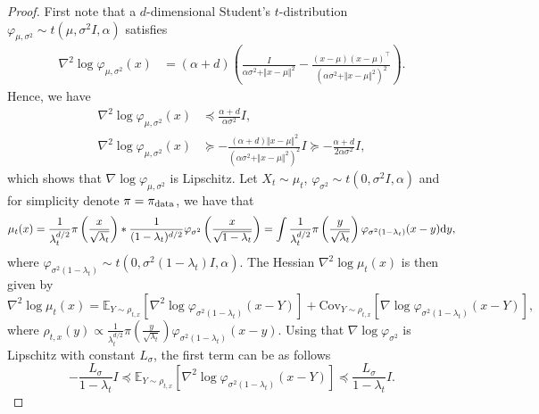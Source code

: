 \begin{proof}
    First note that a $d$-dimensional Student's $t$-distribution $\varphi_{\mu,\sigma^2}\sim t(\mu, \sigma^2 I, \alpha)$ satisfies
    \begin{align*}
         \nabla^2\log \varphi_{\mu, \sigma^2}(x)  &= (\alpha + d) \left( \frac{I}{\alpha \sigma^2 + \Vert x-\mu\Vert^2} - \frac{(x-\mu)(x-\mu)^\intercal}{(\alpha \sigma^2 + \Vert x-\mu\Vert^2)^2}\right).
    \end{align*}
    Hence, we have
    \begin{align*}
    \nabla^2\log \varphi_{\mu, \sigma^2}(x) &\preccurlyeq \frac{\alpha + d}{\alpha \sigma^2} I,\\
         \nabla^2\log \varphi_{\mu, \sigma^2}(x) &\succcurlyeq  - \frac{(\alpha + d)\Vert x-\mu\Vert^2}{(\alpha \sigma^2 + \Vert x-\mu\Vert^2)^2} I \succcurlyeq  -\frac{\alpha + d}{2\alpha \sigma^2} I,
    \end{align*}
    which shows that $\nabla \log\varphi_{\mu, \sigma^2}$ is Lipschitz. Let $X_t\sim \mu_t$, $\varphi_{\sigma^2}\sim t(0, \sigma^2 I, \alpha)$ and for simplicity denote $\pi = \operatorname*{\pi_{\text{data}}}$, we have that
    \begin{equation*}
        \mu_t(x) = \frac{1}{\lambda_t^{d/2}} \pi\left(\frac{x}{\sqrt{\lambda_t}}\right) * \frac{1}{(1-\lambda_t)^{d/2}}\varphi_{\sigma^2}\left(\frac{x}{\sqrt{1-\lambda_t}}\right) = \int \frac{1}{\lambda_t^{d/2}} \pi\left(\frac{y}{\sqrt{\lambda_t}}\right) \varphi_{\sigma^2(1-\lambda_t)}(x-y) \mathrm{d} y,
    \end{equation*}
    where $\varphi_{\sigma^2(1-\lambda_t)}\sim t(0, \sigma^2(1-\lambda_t)I, \alpha)$.
The Hessian $\nabla^2 \log\mu_t(x)$ is then given by
\begin{equation*}
    \nabla^2\log\mu_t(x) = \mathbb{E}_{Y\sim \rho_{t, x}} \left[\nabla^2 \log \varphi_{\sigma^2(1-\lambda_t)}(x - Y)\right] + \text{Cov}_{Y\sim \rho_{t, x}} [\nabla \log\varphi_{\sigma^2(1-\lambda_t) }(x- Y)],
\end{equation*}
where $\rho_{t, x} (y) \propto \frac{1}{\lambda_t^{d/2}} \pi\left(\frac{y}{\sqrt{\lambda_t}}\right) \varphi_{\sigma^2(1-\lambda_t)}(x-y)$.
Using that $\nabla\log\varphi_{\sigma^2}$ is Lipschitz with constant $L_\sigma$, the first term can be as follows
\begin{equation*}
    -\frac{L_\sigma}{1-\lambda_t}I\preccurlyeq\mathbb{E}_{Y\sim \rho_{t, x}} \left[\nabla^2 \log \varphi_{\sigma^2(1-\lambda_t)}(x - Y)\right] \preccurlyeq \frac{L_\sigma}{1-\lambda_t} I.
\end{equation*}

\end{proof}
